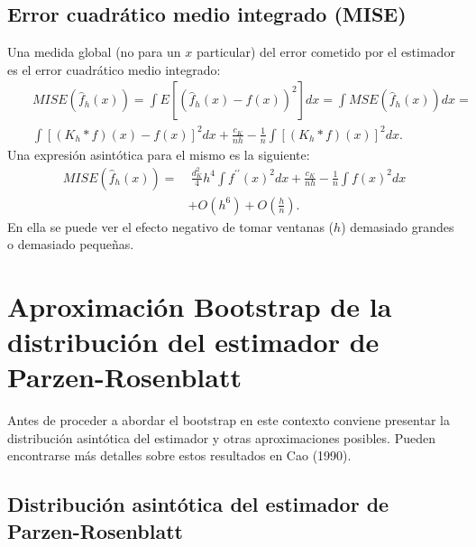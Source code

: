 \documentclass[
]{book}
\theoremstyle{break}
\theoremstyle{definition}
\theoremstyle{definition}
\theoremstyle{definition}
\theoremstyle{remark}
\begin{document}
\hypertarget{error-cuadruxe1tico-medio-integrado-mise}{%
\subsection{Error cuadrático medio integrado (MISE)}\label{error-cuadruxe1tico-medio-integrado-mise}}

Una medida global (no para un \(x\) particular) del error cometido por el
estimador es el error cuadrático medio integrado:
\[\begin{aligned}
& & MISE\left( \hat{f}_{h}\left( x \right) \right) =\int E\left[ \left( \hat{f}
_{h}\left( x \right) -f\left( x \right) \right)^2\right] dx=\int MSE\left( 
\hat{f}_{h}\left( x \right) \right) dx= \\
&&\int \left[ \left( K_{h}\ast f \right) \left( x \right) -f\left( x \right) 
\right]^2dx+\frac{c_{K}}{nh}-\frac{1}{n}\int \left[ \left( K_{h}\ast
f \right) \left( x \right) \right]^2dx.
\end{aligned}\]
Una expresión asintótica para el mismo es la siguiente:
\[\begin{aligned}
MISE\left( \hat{f}_{h}\left( x \right) \right) =&\ \frac{d_{K}^2}{4}h^4\int
f^{\prime \prime }\left( x \right)^2dx+\frac{c_{K}}{nh}-\frac{1}{n}\int
f\left( x \right)^2dx \\
&+O\left( h^{6} \right) +O \left( \frac{h}{n} \right).
\end{aligned}\]
En ella se puede ver el efecto negativo de tomar ventanas (\(h\)) demasiado
grandes o demasiado pequeñas.

\hypertarget{aproximacion-bootstrap}{%
\section{Aproximación Bootstrap de la distribución del estimador de Parzen-Rosenblatt}\label{aproximacion-bootstrap}}

Antes de proceder a abordar el bootstrap en este contexto conviene
presentar la distribución asintótica del estimador y otras
aproximaciones posibles. Pueden encontrarse más detalles sobre estos
resultados en Cao (1990).

\hypertarget{distribuciuxf3n-asintuxf3tica-del-estimador-de-parzen-rosenblatt}{%
\subsection{Distribución asintótica del estimador de Parzen-Rosenblatt}\label{distribuciuxf3n-asintuxf3tica-del-estimador-de-parzen-rosenblatt}}
\end{document}
